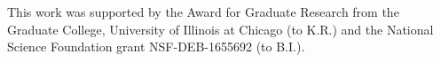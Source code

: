 \documentclass[fleqn,10pt,lineno]{wlpeerj}
\begin{document}
This work was supported by the Award for Graduate Research from the Graduate College, University of Illinois at Chicago (to K.R.) and the National Science Foundation grant NSF-DEB-1655692 (to B.I.).

\clearpage
%



\end{document}
